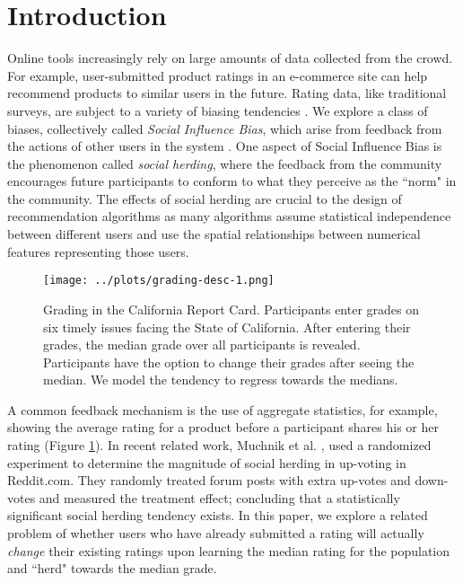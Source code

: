 \section{Introduction}
Online tools increasingly rely on large amounts of data collected from the crowd.
For example, user-submitted product ratings in an e-commerce site can help recommend products to similar users in the future.
Rating data, like traditional surveys, are subject to a variety of biasing tendencies \cite{groves2013survey}.
We explore a class of biases, collectively called \emph{Social Influence Bias}, which arise from feedback from the actions of other users in the system \cite{demarzo2003persuasion, moscovici1972social, wood2000attitude}.
One aspect of Social Influence Bias is the phenomenon called \emph{social herding}, where the feedback from the community encourages future participants to conform to what they perceive as the ``norm" in the community.
The effects of social herding are crucial to the design of recommendation algorithms as many algorithms assume statistical independence between different users and use the spatial relationships between numerical features representing those users.

\begin{figure}[h]
  \centering
    \texttt{[image: ../plots/grading-desc-1.png]}
      \caption{Grading in the California Report Card. Participants enter grades on six timely issues facing the State of California. After entering their grades, the median grade over all participants is revealed. Participants have the option to change their grades after seeing the median. We model the tendency to regress towards the medians.}
      \label{grading-1}
\end{figure}

A common feedback mechanism is the use of aggregate statistics, for example, showing the average rating for a product before a participant shares his or her rating (Figure \ref{grading-1}).
In recent related work, Muchnik et al. \cite{muchnik2013social}, used a randomized experiment to determine the magnitude of social herding in up-voting in Reddit.com.
They randomly treated forum posts with extra up-votes and down-votes and measured the treatment effect; concluding that a statistically significant social herding tendency exists.
In this paper, we explore a related problem of whether users who have already submitted a rating will actually \emph{change} their existing ratings upon learning the median rating for the population and ``herd" towards the median grade.

